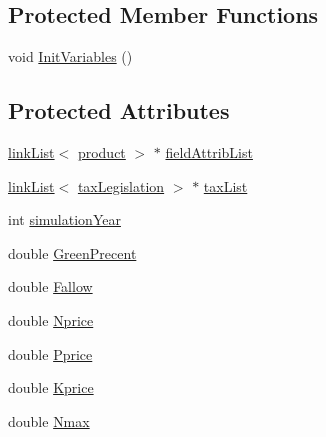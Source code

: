 \subsection*{Protected Member Functions}
\begin{DoxyCompactItemize}
\item 
void \hyperlink{classlegislate_a4f987bac101e783b992245a8541d7b34}{InitVariables} ()
\end{DoxyCompactItemize}
\subsection*{Protected Attributes}
\begin{DoxyCompactItemize}
\item 
\hyperlink{classlink_list}{linkList}$<$ \hyperlink{classproduct}{product} $>$ $\ast$ \hyperlink{classlegislate_af44d0fa6a200c08d12117bb3826166af}{fieldAttribList}
\item 
\hyperlink{classlink_list}{linkList}$<$ \hyperlink{classtax_legislation}{taxLegislation} $>$ $\ast$ \hyperlink{classlegislate_a8c46861a853dc95e9bb2ba62270e12ff}{taxList}
\item 
int \hyperlink{classlegislate_afcb6a9247a41a1ebbe825d5046a59910}{simulationYear}
\item 
double \hyperlink{classlegislate_a37450fa9b052799e02c330924e765698}{GreenPrecent}
\item 
double \hyperlink{classlegislate_a506189710b9609850f54a85ac8cbde4f}{Fallow}
\item 
double \hyperlink{classlegislate_aaff56136764eb06a5e710025a13f4a63}{Nprice}
\item 
double \hyperlink{classlegislate_a87333630df0b33be69eec765cd1136e9}{Pprice}
\item 
double \hyperlink{classlegislate_a6bad541fd82777f4f49643606735e8c3}{Kprice}
\item 
double \hyperlink{classlegislate_ade274de9eef9fb1531405290cf95a293}{Nmax}
\end{DoxyCompactItemize}


